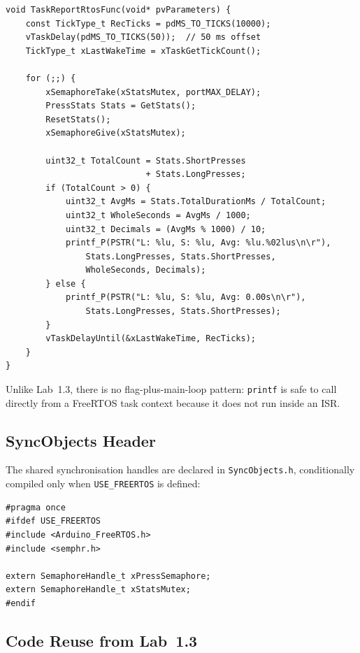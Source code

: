 \documentclass[12pt]{article}
\begin{document}
\begin{lstlisting}[caption={TaskReportRtosFunc — periodic reporter}]
void TaskReportRtosFunc(void* pvParameters) {
    const TickType_t RecTicks = pdMS_TO_TICKS(10000);
    vTaskDelay(pdMS_TO_TICKS(50));  // 50 ms offset
    TickType_t xLastWakeTime = xTaskGetTickCount();

    for (;;) {
        xSemaphoreTake(xStatsMutex, portMAX_DELAY);
        PressStats Stats = GetStats();
        ResetStats();
        xSemaphoreGive(xStatsMutex);

        uint32_t TotalCount = Stats.ShortPresses
                            + Stats.LongPresses;
        if (TotalCount > 0) {
            uint32_t AvgMs = Stats.TotalDurationMs / TotalCount;
            uint32_t WholeSeconds = AvgMs / 1000;
            uint32_t Decimals = (AvgMs % 1000) / 10;
            printf_P(PSTR("L: %lu, S: %lu, Avg: %lu.%02lus\n\r"),
                Stats.LongPresses, Stats.ShortPresses,
                WholeSeconds, Decimals);
        } else {
            printf_P(PSTR("L: %lu, S: %lu, Avg: 0.00s\n\r"),
                Stats.LongPresses, Stats.ShortPresses);
        }
        vTaskDelayUntil(&xLastWakeTime, RecTicks);
    }
}
\end{lstlisting}

Unlike Lab~1.3, there is no flag-plus-main-loop pattern: \texttt{printf} is safe to call directly from a FreeRTOS task context because it does not run inside an ISR.

\subsection{SyncObjects Header}

The shared synchronisation handles are declared in \texttt{SyncObjects.h}, conditionally compiled only when \texttt{USE\_FREERTOS} is defined:

\begin{lstlisting}[caption={SyncObjects.h — conditional RTOS declarations}]
#pragma once
#ifdef USE_FREERTOS
#include <Arduino_FreeRTOS.h>
#include <semphr.h>

extern SemaphoreHandle_t xPressSemaphore;
extern SemaphoreHandle_t xStatsMutex;
#endif
\end{lstlisting}

\subsection{Code Reuse from Lab~1.3}
\end{document}
